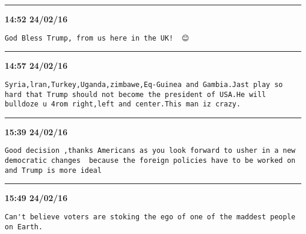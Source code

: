 \hrule%

\begin{adjustwidth}{0cm}{0cm}
\footnotesize \textbf{14:52 24/02/16}

\begin{lstlisting}[breaklines, breakatwhitespace, basicstyle=\small, frame=leftline]
God Bless Trump, from us here in the UK!  😊
\end{lstlisting}
\end{adjustwidth}

\hrule%

\begin{adjustwidth}{0cm}{0cm}
\footnotesize \textbf{14:57 24/02/16}

\begin{lstlisting}[breaklines, breakatwhitespace, basicstyle=\small, frame=leftline]
Syria,lran,Turkey,Uganda,zimbawe,Eq-Guinea and Gambia.Jast play so hard that Trump should not become the president of USA.He will bulldoze u 4rom right,left and center.This man iz crazy.
\end{lstlisting}
\end{adjustwidth}

\hrule%

\begin{adjustwidth}{0cm}{0cm}
\footnotesize \textbf{15:39 24/02/16}

\begin{lstlisting}[breaklines, breakatwhitespace, basicstyle=\small, frame=leftline]
Good decision ,thanks Americans as you look forward to usher in a new democratic changes  because the foreign policies have to be worked on and Trump is more ideal
\end{lstlisting}
\end{adjustwidth}

\hrule%

\begin{adjustwidth}{0cm}{0cm}
\footnotesize \textbf{15:49 24/02/16}

\begin{lstlisting}[breaklines, breakatwhitespace, basicstyle=\small, frame=leftline]
Can't believe voters are stoking the ego of one of the maddest people on Earth.
\end{lstlisting}
\end{adjustwidth}

